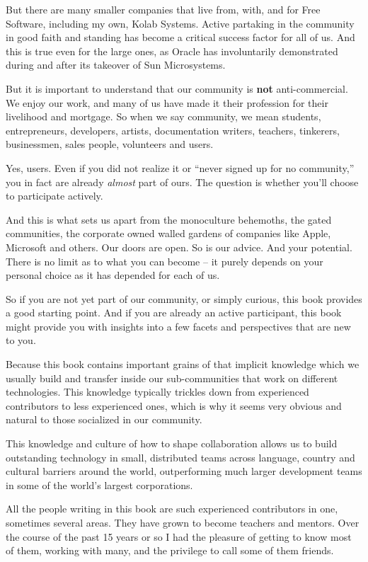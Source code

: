 But there are many smaller companies that live from, with, and for
Free Software, including my own, Kolab Systems. Active partaking in
the community in good faith and standing has become a critical success
factor for all of us. And this is true even for the large ones, as
Oracle has involuntarily demonstrated during and after its takeover of
Sun Microsystems.

But it is important to understand that our community is \textbf{not}
anti-commercial. We enjoy our work, and many of us have made it their
profession for their livelihood and mortgage. So when we say
community, we mean students, entrepreneurs, developers, artists,
documentation writers, teachers, tinkerers, businessmen, sales people,
volunteers and users.

Yes, users. Even if you did not realize it or ``never signed up for no
community,'' you in fact are already \emph{almost} part of ours. The
question is whether you'll choose to participate actively.

And this is what sets us apart from the monoculture behemoths, the
gated communities, the corporate owned walled gardens of companies
like Apple, Microsoft and others. Our doors are open. So is our
advice. And your potential. There is no limit as to what you can
become -- it purely depends on your personal choice as it has
depended for each of us.

So if you are not yet part of our community, or simply curious, this
book provides a good starting point. And if you are already an active
participant, this book might provide you with insights into a few
facets and perspectives that are new to you.

Because this book contains important grains of that implicit
knowledge which we usually build and transfer inside our
sub-communities that work on different technologies. This knowledge
typically trickles down from experienced contributors to less
experienced ones, which is why it seems very obvious and
natural to those socialized in our community.

This knowledge and culture of how to shape collaboration allows us to
build outstanding technology in small, distributed teams across
language, country and cultural barriers around the world,
outperforming much larger development teams in some of the world's
largest corporations.

All the people writing in this book are such experienced contributors
in one, sometimes several areas. They have grown to become teachers
and mentors. Over the course of the past 15 years or so I had the
pleasure of getting to know most of them, working with many, and the
privilege to call some of them friends. 

